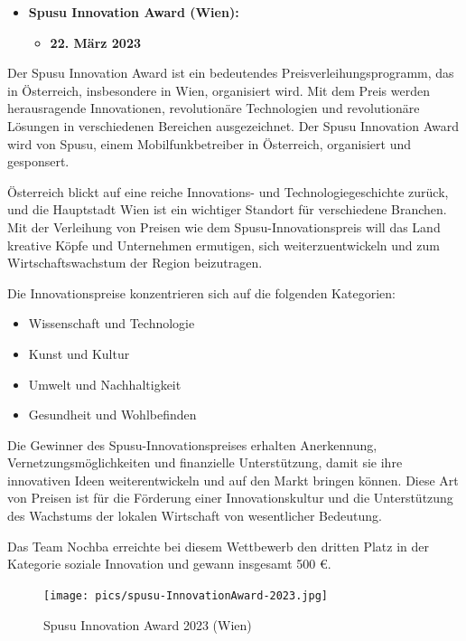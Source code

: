 \begin{itemize}
    \item \textbf{Spusu Innovation Award (Wien):}
          \begin{itemize}
              \item \textbf{22. März 2023}
          \end{itemize}
\end{itemize}

Der Spusu Innovation Award ist ein bedeutendes Preisverleihungsprogramm, das in Österreich, insbesondere in Wien, organisiert wird. Mit dem Preis werden herausragende Innovationen, revolutionäre Technologien und revolutionäre Lösungen in verschiedenen Bereichen ausgezeichnet. Der Spusu Innovation Award wird von Spusu, einem Mobilfunkbetreiber in Österreich, organisiert und gesponsert.

Österreich blickt auf eine reiche Innovations- und Technologiegeschichte zurück, und die Hauptstadt Wien ist ein wichtiger Standort für verschiedene Branchen. Mit der Verleihung von Preisen wie dem Spusu-Innovationspreis will das Land kreative Köpfe und Unternehmen ermutigen, sich weiterzuentwickeln und zum Wirtschaftswachstum der Region beizutragen.

Die Innovationspreise konzentrieren sich auf die folgenden Kategorien:

\begin{itemize}
    \item {Wissenschaft und Technologie}
    \item {Kunst und Kultur}
    \item {Umwelt und Nachhaltigkeit}
    \item {Gesundheit und Wohlbefinden}
\end{itemize}

Die Gewinner des Spusu-Innovationspreises erhalten Anerkennung, Vernetzungsmöglichkeiten und finanzielle Unterstützung, damit sie ihre innovativen Ideen weiterentwickeln und auf den Markt bringen können. Diese Art von Preisen ist für die Förderung einer Innovationskultur und die Unterstützung des Wachstums der lokalen Wirtschaft von wesentlicher Bedeutung.

Das Team Nochba erreichte bei diesem Wettbewerb den dritten Platz in der Kategorie soziale Innovation und gewann insgesamt 500 €.

\begin{figure}[H]
    \centering
    \texttt{[image: pics/spusu-InnovationAward-2023.jpg]}
    \caption{Spusu Innovation Award 2023 (Wien)}
    \label{fig:spusu-InnovationAward-2023}
\end{figure}


